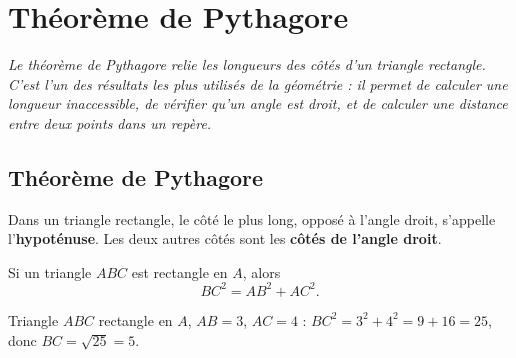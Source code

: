 \chapter{Théorème de Pythagore}

\noindent\textit{Le théorème de Pythagore relie les longueurs des côtés d'un triangle
rectangle. C'est l'un des résultats les plus utilisés de la géométrie : il permet de
calculer une longueur inaccessible, de vérifier qu'un angle est droit, et de calculer une
distance entre deux points dans un repère.}
\vspace{8pt}

\connecteBanner

\section{Théorème de Pythagore}

\begin{definition}[Vocabulaire]
Dans un triangle rectangle, le côté le plus long, opposé à l'angle droit, s'appelle
l'\textbf{hypoténuse}. Les deux autres côtés sont les \textbf{côtés de l'angle droit}.
\end{definition}

\begin{propriete}
Si un triangle $ABC$ est rectangle en $A$, alors
\[
BC^{2}=AB^{2}+AC^{2}.
\]
\end{propriete}

\begin{illus}
\end{illus}

\begin{exemple}
Triangle $ABC$ rectangle en $A$, $AB=3$, $AC=4$ : $BC^{2}=3^{2}+4^{2}=9+16=25$, donc
$BC=\sqrt{25}=5$.
\end{exemple}


